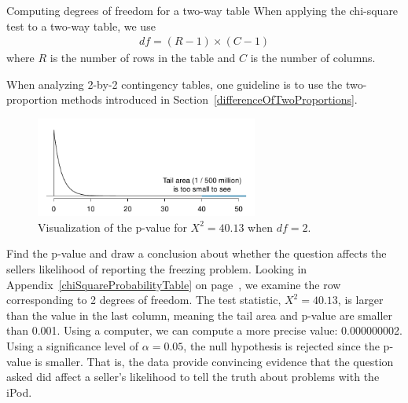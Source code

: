 \begin{onebox}{Computing degrees of freedom for a two-way table}
  When applying the chi-square test to a two-way table,
  we use
  \begin{align*}
  df = (R-1)\times (C-1)
  \end{align*}
  where $R$ is the number of rows in the table
  and $C$ is the number of columns.
\end{onebox}

When analyzing 2-by-2 contingency tables, one guideline
is to use the two-proportion methods introduced in
Section~\ref{differenceOfTwoProportions}.

\begin{figure}[h]
\centering
\includegraphics[width=0.65\textwidth]{ch_inference_for_props/figures/iPodChiSqTail/iPodChiSqTail}
\caption{Visualization of the p-value for $X^2 = 40.13$
    when $df = 2$.}
\label{iPodChiSqTail}
\end{figure}

\begin{examplewrap}
\begin{nexample}{Find the p-value and draw a conclusion
    about whether the question affects the sellers likelihood
    of reporting the freezing problem.}
  Looking in Appendix~\ref{chiSquareProbabilityTable}
  on page~\pageref{chiSquareProbabilityTable},
  we examine the row corresponding to 2 degrees of freedom.
  The test statistic, $X^2 = 40.13$,
  is larger than the value in the last column,
  meaning the tail area and p-value are smaller than 0.001.
  Using a computer, we can compute a more precise value:
  0.000000002.
  Using a significance level of $\alpha=0.05$,
  the null hypothesis is rejected since the p-value is smaller.
  That is, the data provide convincing evidence that the
  question asked did affect a seller's likelihood to tell
  the truth about problems with the iPod.
\end{nexample}
\end{examplewrap}



